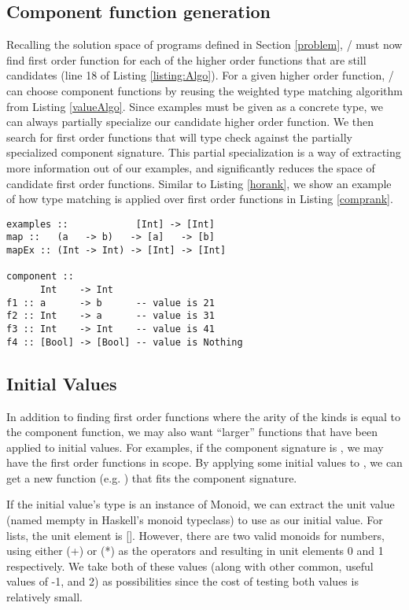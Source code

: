 \subsection{Component function generation}\label{makeFxns}

Recalling the solution space of programs defined in Section \ref{problem}, \ourTool/ must now find first order function for each of the higher order functions that are still candidates (line 18 of Listing \ref{listing:Algo}).
For a given higher order function, \ourTool/ can choose component functions by reusing the weighted type matching algorithm from Listing \ref{valueAlgo}.
Since examples must be given as a concrete type, we can always partially specialize our candidate higher order function. 
We then search for first order functions that will type check against the partially specialized component signature.
This partial specialization is a way of extracting more information out of our examples, and significantly reduces the space of candidate first order functions.
Similar to Listing \ref{horank}, we show an example of how type matching is applied over first order functions in Listing \ref{comprank}.

\begin{lstlisting}[caption=Ranking component function,label=comprank]
examples ::            [Int] -> [Int]
map ::   (a   -> b)   -> [a]   -> [b]
mapEx :: (Int -> Int) -> [Int] -> [Int]

component ::
      Int    -> Int
f1 :: a      -> b      -- value is 21
f2 :: Int    -> a      -- value is 31
f3 :: Int    -> Int    -- value is 41
f4 :: [Bool] -> [Bool] -- value is Nothing
\end{lstlisting}

\subsection{Initial Values}\label{initVals}

In addition to finding first order functions where the arity of the kinds is equal to the component function, we may also want ``larger'' functions that have been applied to initial values.
For examples, if the component signature is , we may have the first order functions  in scope.
By applying some initial values to \codeinline{(+)}, we can get a new function (e.g. ) that fits the component signature.

If the initial value's type is an instance of Monoid, we can extract the unit value (named mempty in Haskell's monoid typeclass\cite{monoid}) to use as our initial value. For lists, the unit element is []. However, there are two valid monoids for numbers, using either (+) or (*) as the operators and resulting in unit elements 0 and 1 respectively. We take both of these values (along with other common, useful values of -1, and 2) as possibilities since the cost of testing both values is relatively small.

